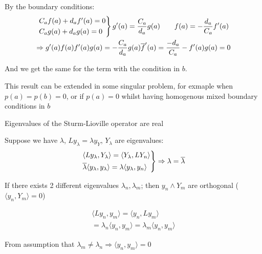 \par\bigskip
\noindent By the boundary conditions:
\begin{equation*}
  \begin{gathered}
    \begin{rcases*}
      C_af(a)+d_af^{\prime}(a) = 0\\
      C_ag(a)+d_ag(a) = 0
    \end{rcases*} g^{\prime}(a) = \dfrac{C_a}{d_a}g(a)\qquad f(a) = -\dfrac{d_a}{C_a}f^{\prime}(a)\\
    \Rightarrow g^{\prime}(a)f(a)f^{\prime}(a)g(a) = -\dfrac{C_a}{d_a}g(a)\overline{f}^{\prime}(a)=  \dfrac{-d_a}{C_a}-f^{\prime}(a)g(a) = 0
  \end{gathered}
\end{equation*}\par
\noindent And we get the same for the term with the condition in $b$.
\par\bigskip
\noindent This result can be extended in some singular problem, for exmaple when $p(a) = p(b) = 0$, or if $p(a) = 0$ whilst having homogenous mixed boundary conditions in $b$ 
\par\bigskip
\begin{theo}[]{}
  Eigenvalues of the Sturm-Lioville operator are real
\end{theo}
\par\bigskip
\begin{prf}[]{}
  Suppose we have $\lambda$, $Ly_\lambda = \lambda y_Y$, $Y_\lambda$ are eigenvalues:
  \begin{equation*}
    \begin{gathered}
      \begin{rcases*}
        \langle L y_{\lambda}, Y_{\lambda}\rangle = \langle Y_{\lambda}, LY_n\rangle\\
        \overline{\lambda}\langle y_\lambda, y_\lambda\rangle = \lambda\langle y_\lambda,y_n\rangle
      \end{rcases*}\Rightarrow \lambda = \overline{\lambda}
    \end{gathered}
  \end{equation*}
\end{prf}
\par\bigskip
\begin{theo}[]{}
  If there exists 2 different eigenvalues $\lambda_n,\lambda_m$; then $y_n\wedge Y_m$ are orthogonal ($\langle y_n,Y_m\rangle = 0$)
\end{theo}
\par\bigskip
\begin{prf}[]{}
  \begin{equation*}
    \begin{gathered}
      \langle Ly_n,y_m\rangle = \langle y_n,Ly_m\rangle\\
      = \lambda_n\langle y_n,y_m\rangle = \lambda_m\langle y_n,y_m\rangle
    \end{gathered}
  \end{equation*}\par
  \noindent From assumption that $\lambda_m\neq\lambda_n\Rightarrow \langle y_n,y_m\rangle = 0$ 
\end{prf}
